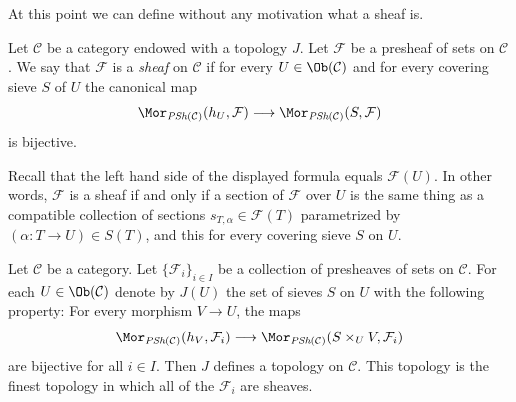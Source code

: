 \noindent
At this point we can define
without any motivation what a sheaf is.

\begin{definition}
\label{definition-sheaf-sets-topology}
Let $\mathcal{C}$ be a category endowed with a
topology $J$. Let $\mathcal{F}$ be a presheaf of sets
on $\mathcal{C}$.
We say that $\mathcal{F}$ is a
{\it sheaf} on $\mathcal{C}$
if for every $U \in \Ob(\mathcal{C})$ and for
every covering sieve $S$ of $U$ the canonical map
$$
\Mor_{\textit{PSh}(\mathcal{C})}(h_U, \mathcal{F})
\longrightarrow
\Mor_{\textit{PSh}(\mathcal{C})}(S, \mathcal{F})
$$
is bijective.
\end{definition}

\noindent
Recall that the left hand side of the displayed
formula equals $\mathcal{F}(U)$. In other words, $\mathcal{F}$
is a sheaf if and only if a section of $\mathcal{F}$
over $U$ is the same thing as a compatible collection of sections
$s_{T, \alpha} \in \mathcal{F}(T)$ parametrized by
$(\alpha : T \to U) \in S(T)$, and this for every covering sieve $S$
on $U$.

\begin{lemma}
\label{lemma-topology-presheaves-sheaves}
Let $\mathcal{C}$ be a category. Let $\{ \mathcal{F}_i \}_{i\in I}$ be a
collection of presheaves of sets on $\mathcal{C}$. For each
$U \in \Ob(\mathcal{C})$ denote by
$J(U)$ the set of sieves $S$ on $U$ with the following property:
For every morphism $V \to U$, the maps
$$
\Mor_{\textit{PSh}(\mathcal{C})}(h_V, \mathcal{F}_i)
\longrightarrow
\Mor_{\textit{PSh}(\mathcal{C})}(S \times_U V, \mathcal{F}_i)
$$
are bijective for all $i \in I$. Then $J$ defines a
topology on $\mathcal{C}$. This topology is the finest
topology in which all of the $\mathcal{F}_i$ are sheaves.
\end{lemma}

